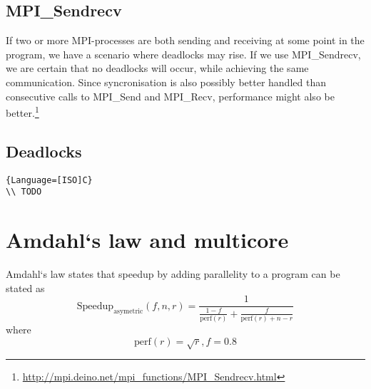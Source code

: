 \documentclass[english,a4paper,numbers=noenddot]{scrartcl}
\begin{document}
\subsection{MPI\_Sendrecv}
If two or more MPI-processes are both sending and receiving at some point in the program, we have a scenario where deadlocks may rise. If we use MPI\_Sendrecv, we are certain that no deadlocks will occur, while achieving the same communication. Since syncronisation is also possibly better handled than consecutive calls to MPI\_Send and MPI\_Recv, performance might also be better.\footnote{\url{http://mpi.deino.net/mpi_functions/MPI_Sendrecv.html}}

\subsection{Deadlocks}
\begin{lstlisting}{Language=[ISO]C}
\\ TODO
\end{lstlisting}

\section{Amdahl`s law and multicore}
Amdahl`s law states that speedup by adding parallelity to a program can be stated as
\begin{equation}
    \text{Speedup}_{\text{asymetric}} (f,n,r)= \frac{1}{\frac{1-f}{\text{perf}(r)} + \frac{f}{\text{perf}(r) + n - r}}
\end{equation}
where
\begin{equation}
    \text{perf}(r)=\sqrt r,f=0.8
\end{equation}
\end{document}
